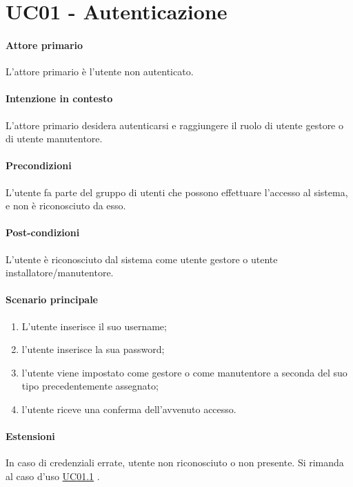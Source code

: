 \section{UC01 - Autenticazione}\label{uc:01}

\paragraph{Attore primario} L'attore primario è l'utente non autenticato.

\paragraph{Intenzione in contesto} L'attore primario desidera autenticarsi e raggiungere il ruolo di utente gestore o di utente manutentore.

\paragraph{Precondizioni} L'utente fa parte del gruppo di utenti che possono effettuare l'accesso al sistema, e non è riconosciuto da esso.

\paragraph{Post-condizioni} L'utente è riconosciuto dal sistema come utente gestore o utente installatore/manutentore.

\paragraph{Scenario principale}
\begin{enumerate}
    \item L'utente inserisce il suo username;
    \item l'utente inserisce la sua password;
    \item l'utente viene impostato come gestore o come manutentore a seconda del suo tipo precedentemente assegnato; 
    \item l'utente riceve una conferma dell'avvenuto accesso.
\end{enumerate}


\paragraph{Estensioni} In caso di credenziali errate, utente non riconosciuto o non presente. Si rimanda al caso d'uso \hyperref[uc:01.1]{UC01.1} .

